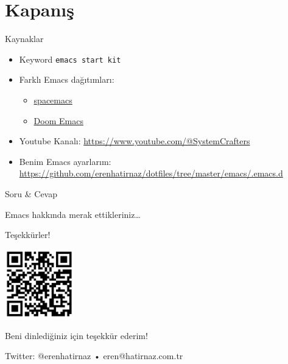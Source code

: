 \documentclass[presentation,smaller]{beamer}
\begin{document}
\section{Kapanış}
\label{sec:orgb414e60}
\begin{frame}[label={sec:orga85276a},fragile]{Kaynaklar}
 \begin{itemize}
\item Keyword \texttt{emacs start kit}
\item Farklı Emacs dağıtımları:
\begin{itemize}
\item \href{https://github.com/syl20bnr/spacemacs/tree/develop}{spacemacs}
\item \href{https://github.com/doomemacs/doomemacs}{Doom Emacs}
\end{itemize}
\item Youtube Kanalı: \url{https://www.youtube.com/@SystemCrafters}
\item Benim Emacs ayarlarım: \url{https://github.com/erenhatirnaz/dotfiles/tree/master/emacs/.emacs.d}
\end{itemize}
\end{frame}
\begin{frame}[label={sec:org8b41b54}]{Soru \& Cevap}
\begin{center}
Emacs hakkında merak ettikleriniz\ldots{}
\end{center}
\end{frame}
\begin{frame}[label={sec:orgbb57510}]{Teşekkürler!}
\begin{center}
\includegraphics[height=3cm]{../_images/repo_qrcode.png}
\end{center}

\begin{center}
\alert{\alert{Beni dinlediğiniz için teşekkür ederim!}}

\vspace{1in}

Twitter: @erenhatirnaz • eren@hatirnaz.com.tr
\end{center}
\end{frame}
\end{document}
